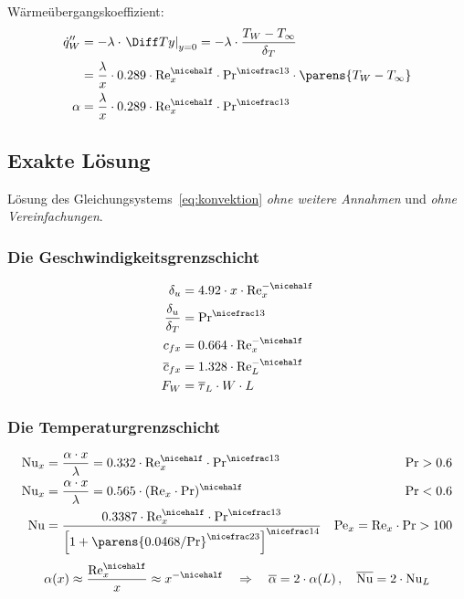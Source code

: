 			Wärmeübergangskoeffizient:
			\begin{align*}
				\dot q_W'' &= -\lambda \cdot \left. \Diff T y \right|_{y=0} = - \lambda \cdot \frac{T_W - T_\infty}{\delta_T} \\
				&= \frac \lambda x \cdot 0.289 \cdot \mathrm{Re}_x^{\nicehalf} \cdot \mathrm{Pr}^{\nicefrac 1 3} \cdot \parens{T_W - T_\infty} \\
				\alpha &= \frac \lambda x \cdot 0.289 \cdot \mathrm{Re}_x^{\nicehalf} \cdot \mathrm{Pr}^{\nicefrac 1 3}
			\end{align*}
	\subsection{Exakte Lösung} %
		Lösung des Gleichungsystems~\eqref{eq:konvektion} \emph{ohne weitere Annahmen} und \emph{ohne Vereinfachungen}.
		
		\subsubsection{Die Geschwindigkeitsgrenzschicht} %
			\begin{align*}
				\delta_u &= 4.92 \cdot x \cdot \mathrm{Re}_x^{-\nicehalf} \\
				\frac{\delta_u}{\delta_T} &= \mathrm{Pr}^{\nicefrac 1 3} \\
				c_{fx} &= 0.664 \cdot \mathrm{Re}_x^{-\nicehalf} \\
				\overline c_{fx} &= 1.328 \cdot \mathrm{Re}_L^{-\nicehalf} \\
				F_W &= \overline\tau_L \cdot W \cdot L
			\end{align*}
		\subsubsection{Die Temperaturgrenzschicht} %
			\begin{align*}
				\mathrm{Nu}_x &= \frac{\alpha \cdot x}{\lambda} = 0.332 \cdot \mathrm{Re}_x^{\nicehalf} \cdot \mathrm{Pr}^{\nicefrac 1 3} & \mathrm{Pr} > 0.6 \\
				\mathrm{Nu}_x &= \frac{\alpha \cdot x}{\lambda} = 0.565 \cdot (\mathrm{Re}_x\vphantom{1^2} \cdot \mathrm{Pr})^{\nicehalf} & \mathrm{Pr} < 0.6 \\
				\mathrm{Nu} &= \frac{0.3387 \cdot \mathrm{Re}_x^{\nicehalf} \cdot \mathrm{Pr}^{\nicefrac 1 3}}{\left[
					1 + \parens{
						0.0468 / \mathrm{Pr}
					}^{\nicefrac 2 3}
				\right]^{\nicefrac 1 4}} & \mathrm{Pe}_x = \mathrm{Re}_x \cdot \mathrm{Pr} > 100
			\end{align*}
			\[
				\alpha(x) \approx \frac{\mathrm{Re}_x^{\nicehalf}}{x} \approx x^{-\nicehalf} \quad \Rightarrow \quad \overline\alpha = 2 \cdot \alpha(L)\,,\quad \overline{\mathrm{Nu}} = 2 \cdot \mathrm{Nu}_L
			\]
